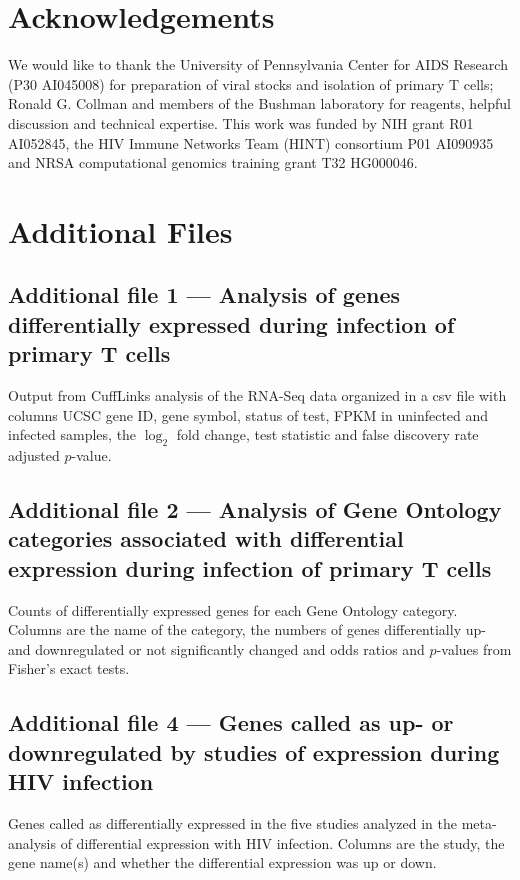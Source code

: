 \documentclass[../sherrill-Mix_thesis.tex]{subfiles}
\begin{document}
\section{Acknowledgements}
  We would like to thank the University of Pennsylvania Center for AIDS Research (P30 AI045008) for preparation of viral stocks and isolation of primary \cdFour{} T cells; Ronald G. Collman and members of the Bushman laboratory for reagents, helpful discussion and technical expertise. This work was funded by NIH grant R01 AI052845, the HIV Immune Networks Team (HINT) consortium P01 AI090935 and NRSA computational genomics training grant T32 HG000046.  

\clearpage %
\section{Additional Files}
  \subsection{Additional file 1 ---  Analysis of genes differentially expressed during \hivEight{} infection of primary \cdFour{} T cells}
		Output from CuffLinks analysis of the RNA-Seq data organized in a csv file with columns UCSC gene ID, gene symbol, status of test, FPKM in uninfected and infected samples, the $\log_2$ fold change, test statistic and false discovery rate adjusted $p$-value.


  \subsection{Additional file 2 --- Analysis of Gene Ontology categories associated with differential expression during \hivEight{} infection of primary \cdFour{} T cells}
		Counts of differentially expressed genes for each Gene Ontology category. Columns are the name of the category, the numbers of genes differentially up- and downregulated or not significantly changed and odds ratios and $p$-values from Fisher's exact tests.

  \subsection{Additional file 4 --- Genes called as up- or downregulated by studies of expression during HIV infection}
    Genes called as differentially expressed in the five studies analyzed in the meta-analysis of differential expression with HIV infection. Columns are the study, the gene name(s) and whether the differential expression was up or down.
\end{document}
